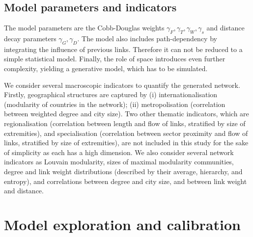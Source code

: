 \documentclass[11pt]{article}
\begin{document}
\begin{itemize}
\begin{itemize}
    \end{itemize}
\end{itemize}






\subsection{Model parameters and indicators}


The model parameters are the Cobb-Douglas weights $\gamma_F,\gamma_T,\gamma_W,\gamma_s$ and distance decay parameters $\gamma_G,\gamma_D$. The model also includes path-dependency by integrating the influence of previous links. Therefore it can not be reduced to a simple statistical model. Finally, the role of space introduces even further complexity, yielding a generative model, which has to be simulated.

We consider several macroscopic indicators to quantify the generated network. Firstly, geographical structures are captured by (i) internationalisation (modularity of countries in the network); (ii) metropolisation (correlation between weighted degree and city size). Two other thematic indicators, which are regionalisation (correlation between length and flow of links, stratified by size of extremities), and specialisation (correlation between sector proximity and flow of links, stratified by size of extremities), are not included in this study for the sake of simplicity as each has a high dimension. We also consider several network indicators as Louvain modularity, sizes of maximal modularity communities, degree and link weight distributions (described by their average, hierarchy, and entropy), and correlations between degree and city size, and between link weight and distance.



\section{Model exploration and calibration}
\end{document}
